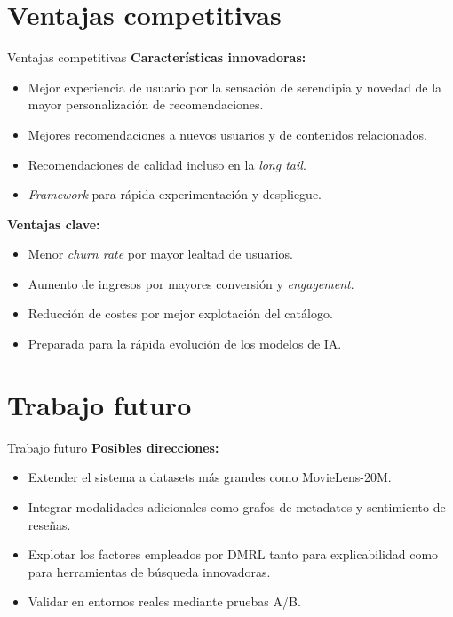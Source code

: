\documentclass{beamer}
\begin{document}
\section{Ventajas competitivas}
\begin{frame}{Ventajas competitivas}
    \textbf{Características innovadoras:}
    \pause
    \begin{itemize}
        \item Mejor experiencia de usuario por la sensación de serendipia y novedad de la mayor personalización de recomendaciones. \pause
        \item Mejores recomendaciones a nuevos usuarios y de contenidos relacionados. \pause
        \item Recomendaciones de calidad incluso en la \textit{long tail}. \pause
        \item \textit{Framework} para rápida experimentación y despliegue.
    \end{itemize}
    \pause
    \textbf{Ventajas clave:}
    \pause
    \begin{itemize}
        \item Menor \textit{churn rate} por mayor lealtad de usuarios. \pause
        \item Aumento de ingresos por mayores conversión y \textit{engagement}. \pause
        \item Reducción de costes por mejor explotación del catálogo. \pause
        \item Preparada para la rápida evolución de los modelos de IA.
    \end{itemize}
\end{frame}

\section{Trabajo futuro}
\begin{frame}{Trabajo futuro}
    \textbf{Posibles direcciones:}
    \pause
    \begin{itemize}
        \item Extender el sistema a datasets más grandes como MovieLens-20M.
        \pause
        \item Integrar modalidades adicionales como grafos de metadatos y sentimiento de reseñas.
        \pause
        \item Explotar los factores empleados por DMRL tanto para explicabilidad como para 
        herramientas de búsqueda innovadoras.
        \pause
        \item Validar en entornos reales mediante pruebas A/B.
    \end{itemize}
\end{frame}
\end{document}

